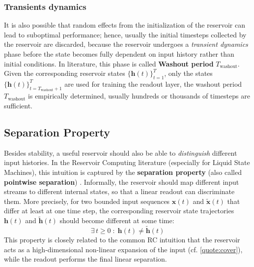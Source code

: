 \subsubsection{Transients dynamics}
It is also possible that random effects from the initialization of the reservoir can lead to suboptimal performance; hence, usually the initial timesteps collected by the reservoir are discarded,
because the reservoir undergoes a \textit{transient dynamics} phase before the state becomes fully dependent on input history rather than initial conditions.
In literature, this phase is called \textbf{Washout period} $T_{\text{washout}}$.
Given the corresponding reservoir states $\{\mathbf{h}(t)\}_{t=1}^{T}$, only the states $\{\mathbf{h}(t)\}_{t=T_{\text{washout}}+1}^{T}$ 
are used for training the readout layer, the washout period $T_{\text{washout}}$ is empirically determined, usually hundreds or thousands of timesteps are sufficient.

\subsection{Separation Property}
Besides stability, a useful reservoir should also be able to \textit{distinguish} different input histories.
In the Reservoir Computing literature (especially for Liquid State Machines), this intuition is captured by the \textbf{separation property} (also called \textbf{pointwise separation}) \cite{maass2002realtime}.
Informally, the reservoir should map different input streams to different internal states, so that a linear readout can discriminate them.
More precisely, for two bounded input sequences $\mathbf{x}(t)$ and $\tilde{\mathbf{x}}(t)$ that differ at least at one time step, the corresponding reservoir state trajectories $\mathbf{h}(t)$ and $\tilde{\mathbf{h}}(t)$ should become different at some time:
\begin{equation}
    \exists\, t \ge 0 \;:\; \mathbf{h}(t) \neq \tilde{\mathbf{h}}(t)
\end{equation}
This property is closely related to the common RC intuition that the reservoir acts as a high-dimensional non-linear expansion of the input (cf. \ref{quote:cover}), while the readout performs the final linear separation.

